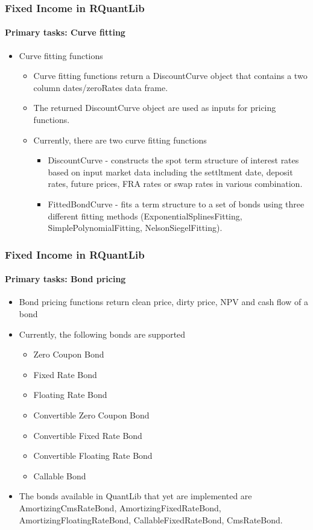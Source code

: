 \documentclass[smaller,compress, 9pt]{beamer}
\begin{document}
\begin{frame}
	\frametitle{Fixed Income in RQuantLib}
	\framesubtitle{Primary tasks: Curve fitting}
	\begin{itemize}
		\item Curve fitting functions
			\begin{itemize}
				\item Curve fitting functions return a DiscountCurve object that contains a two column dates/zeroRates data frame.
				\item The returned DiscountCurve object are used as inputs for pricing functions. 
				\item Currently, there are two curve fitting functions
					\begin{itemize}
						\item DiscountCurve - constructs the spot term structure of interest rates based on input market data including the settltment date, deposit rates, future prices, FRA rates or swap rates in various combination.
						\item FittedBondCurve - fits a term structure to a set of bonds using three different fitting methods (ExponentialSplinesFitting, SimplePolynomialFitting, NelsonSiegelFitting).
					\end{itemize}
			\end{itemize}
	\end{itemize}
\end{frame}

\begin{frame}
	\frametitle{Fixed Income in RQuantLib}
	\framesubtitle{Primary tasks: Bond pricing}
	\begin{itemize}
		\item Bond pricing functions return clean price, dirty price, NPV and cash flow of a bond
		\item Currently, the following bonds are supported
			\begin{itemize}
				\item Zero Coupon Bond
				\item Fixed Rate Bond
				\item Floating Rate Bond
				\item Convertible Zero Coupon Bond
				\item Convertible Fixed Rate Bond												
				\item Convertible Floating Rate Bond
				\item Callable Bond
			\end{itemize}
		\item The bonds available in QuantLib that yet are implemented are AmortizingCmsRateBond, AmortizingFixedRateBond, AmortizingFloatingRateBond, CallableFixedRateBond, CmsRateBond.
	\end{itemize}
\end{frame}
\end{document}
